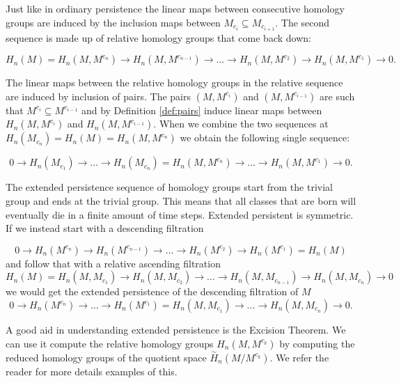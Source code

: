 Just like in ordinary persistence the linear maps between consecutive homology groups are induced by the inclusion maps between $M_{c_i} \subseteq M_{c_{i+1}}$. The second sequence is made up of relative homology groups that come back down:

$$ H_n(M) = H_n(M, M^{c_n}) \rightarrow H_n(M, M^{c_{n-1}}) \rightarrow... \rightarrow H_n(M, M^{c_{2}}) \rightarrow H_n(M, M^{c_{1}}) \rightarrow 0.$$

The linear maps between the relative homology groups in the relative sequence are induced by inclusion of pairs. The pairs $(M, M^{c_i})$ and $(M, M^{c_{i-1}})$ are such that $M^{c_i} \subseteq M^{c_{i-1}}$ and by Definition \ref{def:pairs} induce linear maps between $H_n(M, M^{c_i})$ and $H_n(M, M^{c_{i-1}})$. When we combine the two sequences at $H_n(M_{c_n}) =  H_n(M) = H_n(M, M^{c_n})$ we obtain the following single sequence:

$$ 0 \rightarrow H_n(M_{c_1}) \rightarrow ... \rightarrow H_n(M_{c_n}) = H_n(M, M^{c_n}) \rightarrow ... \rightarrow H_n(M, M^{c_{1}}) \rightarrow 0.$$

The extended persistence sequence of homology groups start from the trivial group and ends at the trivial group. This means that all classes that are born will eventually die in a finite amount of time steps. Extended persistent is symmetric. If we instead start with a descending filtration

$$ 0 \rightarrow H_n(M^{c_n}) \rightarrow H_n(M^{c_{n-1}}) \rightarrow ... \rightarrow H_n(M^{c_{2}}) \rightarrow H_n(M^{c_1}) =  H_n(M) $$
and follow that with a relative ascending filtration
$$ H_n(M) = H_n(M, M_{c_1}) \rightarrow H_n(M, M_{c_{2}}) \rightarrow... \rightarrow H_n(M, M_{c_{n-1}}) \rightarrow H_n(M, M_{c_{n}}) \rightarrow 0 $$
we would get the extended persistence of the descending filtration of $M$
$$ 0 \rightarrow H_n(M^{c_n}) \rightarrow ... \rightarrow H_n(M^{c_1}) = H_n(M, M_{c_1}) \rightarrow ... \rightarrow H_n(M, M_{c_n}) \rightarrow 0.$$

A good aid in understanding extended persistence is the Excision Theorem. We can use it compute the relative homology groups $H_n(M, M^{c_k})$ by computing the reduced homology groups of the quotient space $\overset{\sim}{H}_n(M / M^{c_k})$. We refer the reader \cite{folded-molecules} for more details examples of this.


